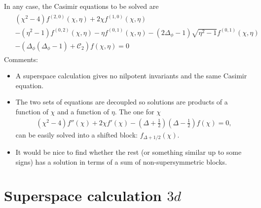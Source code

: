\documentclass[letterpaper]{article}
\let\Oldsection\section
\renewcommand{\section}{\FloatBarrier\Oldsection}
\def\Om{{\mathcal{O}}}
\begin{document}
In any case, the Casimir equations to be solved are
\begin{align}
\begin{split}
& (\chi^2 - 4) f^{(2,0)}(\chi, \eta) 
  + 2 \chi f^{(1,0)}(\chi, \eta) \\
& - (\eta^2 - 1) f^{(0,2)}(\chi, \eta)
  - \eta f^{(0,1)}(\chi, \eta)
  - (2\Delta_\phi - 1) \sqrt{\eta^2 -1 } f^{(0,1)}(\chi, \eta) \\
& - \left( \Delta_\phi(\Delta_\phi - 1)
  + \mathcal{C}_2 \right) f(\chi, \eta) = 0
\end{split}
\end{align}
Comments:
\begin{itemize}
 \item A superspace calculation gives no nilpotent invariants and the same Casimir equation.
 \item The two sets of equations are decoupled so solutions are products of a function of $\chi$ and a function of $\eta$. The one for $\chi$
 \begin{align}
  (\chi^2 - 4) f''(\chi) + 2 \chi f'(\chi) 
  - \left(\Delta+\frac{1}{2}\right) \left(\Delta-\frac{1}{2}\right) f(\chi) = 0,
 \end{align}
 can be easily solved into a shifted block: $f_{\Delta+1/2}(\chi)$.
 \item It would be nice to find whether the rest (or something similar up to some signs) has a solution in terms of a sum of non-supersymmetric blocks.
\end{itemize}



\section{Superspace calculation \texorpdfstring{$3d$}{3d}}
\end{document}
